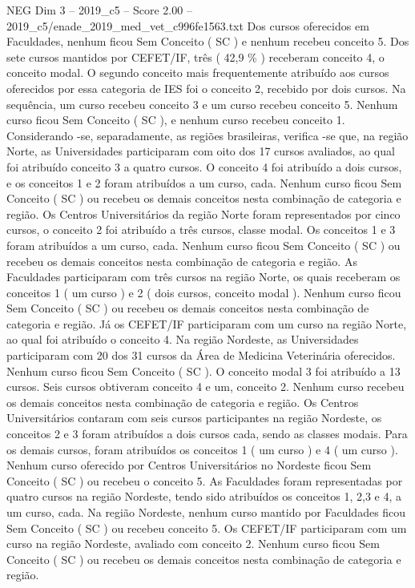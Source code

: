 \begin{textsample}{NEG Dim 3 – 2019\_c5 – Score 2.00 – 2019\_c5/enade\_2019\_med\_vet\_c996fe1563.txt}
Dos cursos oferecidos em Faculdades, nenhum ficou Sem Conceito ( SC ) e nenhum recebeu conceito 5.
Dos sete cursos mantidos por CEFET/IF, três ( 42,9 \% ) receberam conceito 4, o conceito modal.
O segundo conceito mais frequentemente atribuído aos cursos oferecidos por essa categoria de IES foi o conceito 2, recebido por dois cursos.
Na sequência, um curso recebeu conceito 3 e um curso recebeu conceito 5.
Nenhum curso ficou Sem Conceito ( SC ), e nenhum curso recebeu conceito 1.
Considerando -se, separadamente, as regiões brasileiras, verifica -se que, na região Norte, as Universidades participaram com oito dos 17 cursos avaliados, ao qual foi atribuído conceito 3 a quatro cursos.
O conceito 4 foi atribuído a dois cursos, e os conceitos 1 e 2 foram atribuídos a um curso, cada.
Nenhum curso ficou Sem Conceito ( SC ) ou recebeu os demais conceitos nesta combinação de categoria e região.
Os Centros Universitários da região Norte foram representados por cinco cursos, o conceito 2 foi atribuído a três cursos, classe modal.
Os conceitos 1 e 3 foram atribuídos a um curso, cada.
Nenhum curso ficou Sem Conceito ( SC ) ou recebeu os demais conceitos nesta combinação de categoria e região.
As Faculdades participaram com três cursos na região Norte, os quais receberam os conceitos 1 ( um curso ) e 2 ( dois cursos, conceito modal ).
Nenhum curso ficou Sem Conceito ( SC ) ou recebeu os demais conceitos nesta combinação de categoria e região.
Já os CEFET/IF participaram com um curso na região Norte, ao qual foi atribuído o conceito 4.
Na região Nordeste, as Universidades participaram com 20 dos 31 cursos da Área de Medicina Veterinária oferecidos.
Nenhum curso ficou Sem Conceito ( SC ).
O conceito modal 3 foi atribuído a 13 cursos.
Seis cursos obtiveram conceito 4 e um, conceito 2.
Nenhum curso recebeu os demais conceitos nesta combinação de categoria e região.
Os Centros Universitários contaram com seis cursos participantes na região Nordeste, os conceitos 2 e 3 foram atribuídos a dois cursos cada, sendo as classes modais.
Para os demais cursos, foram atribuídos os conceitos 1 ( um curso ) e 4 ( um curso ).
Nenhum curso oferecido por Centros Universitários no Nordeste ficou Sem Conceito ( SC ) ou recebeu o conceito 5.
As Faculdades foram representadas por quatro cursos na região Nordeste, tendo sido atribuídos os conceitos 1, 2,3 e 4, a um curso, cada.
Na região Nordeste, nenhum curso mantido por Faculdades ficou Sem Conceito ( SC ) ou recebeu conceito 5.
Os CEFET/IF participaram com um curso na região Nordeste, avaliado com conceito 2.
Nenhum curso ficou Sem Conceito ( SC ) ou recebeu os demais conceitos nesta combinação de categoria e região.

\end{textsample}
